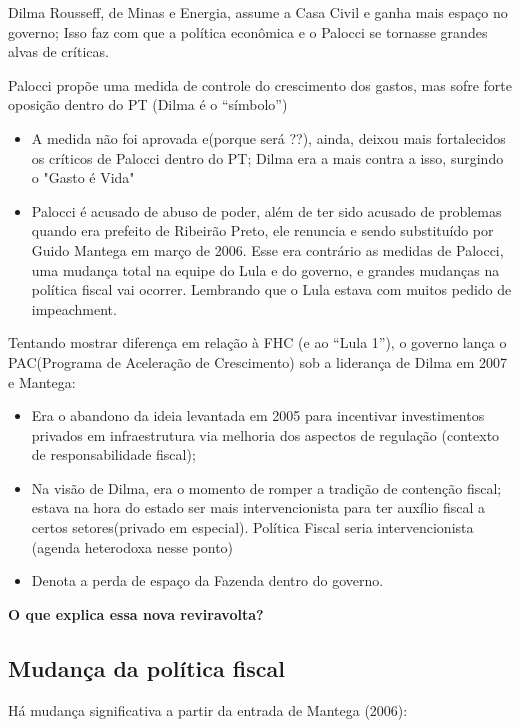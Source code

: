 \documentclass[a4paper,12pt]{article}[abntex2]
\begin{document}
Dilma Rousseff, de Minas e Energia, assume a Casa Civil e ganha mais espaço no governo; Isso faz com que a política econômica e o Palocci se tornasse grandes alvas de críticas.

Palocci propõe uma medida de controle do crescimento dos gastos, mas sofre forte oposição dentro do PT (Dilma é o ``símbolo'')\begin{itemize}
    \item A medida não foi aprovada e(porque será ??), ainda, deixou mais fortalecidos os críticos de Palocci dentro do PT; Dilma era a mais contra a isso, surgindo o "Gasto é Vida"
    \item Palocci é acusado de abuso de poder, além de ter sido acusado de problemas quando era prefeito de Ribeirão Preto, ele renuncia e sendo substituído por Guido Mantega em março de 2006. Esse era contrário as medidas de Palocci, uma mudança total na equipe do Lula e do governo, e grandes mudanças na política fiscal vai ocorrer. Lembrando que o Lula estava com muitos pedido de impeachment.
\end{itemize}

Tentando mostrar diferença em relação à FHC (e ao ``Lula 1''), o governo lança o PAC(Programa de Aceleração de Crescimento) sob a liderança de Dilma em 2007 e Mantega:\begin{itemize}
    \item Era o abandono da ideia levantada em 2005 para incentivar investimentos privados em infraestrutura via melhoria dos aspectos de regulação (contexto de responsabilidade fiscal);
    \item Na visão de Dilma, era o momento de romper a tradição de contenção fiscal; estava na hora do estado ser mais intervencionista para ter auxílio fiscal a certos setores(privado em especial). Política Fiscal seria intervencionista (agenda heterodoxa nesse ponto)
    \item Denota a perda de espaço da Fazenda dentro do governo.
\end{itemize}

\textbf{O que explica essa nova reviravolta?}

\subsection{\textbf{Mudança da política fiscal}}
Há mudança significativa a partir da entrada de Mantega (2006):
\end{document}
